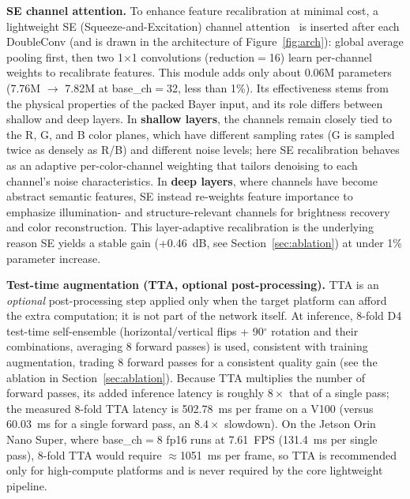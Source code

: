 \documentclass[remotesensing,article,accept,moreauthors]{Definitions/mdpi}
\begin{document}
\textbf{SE channel attention.} To enhance feature recalibration at minimal cost, a lightweight SE (Squeeze-and-Excitation) channel attention~\citep{hu2018se} is inserted after each DoubleConv (and is drawn in the architecture of Figure~\ref{fig:arch}): global average pooling first, then two 1$\times$1 convolutions (reduction$=$16) learn per-channel weights to recalibrate features. This module adds only about 0.06M parameters (7.76M $\rightarrow$ 7.82M at base\_ch$=$32, less than 1\%). Its effectiveness stems from the physical properties of the packed Bayer input, and its role differs between shallow and deep layers. In \textbf{shallow layers}, the channels remain closely tied to the R, G, and B color planes, which have different sampling rates (G is sampled twice as densely as R/B) and different noise levels; here SE recalibration behaves as an adaptive per-color-channel weighting that tailors denoising to each channel's noise characteristics. In \textbf{deep layers}, where channels have become abstract semantic features, SE instead re-weights feature importance to emphasize illumination- and structure-relevant channels for brightness recovery and color reconstruction. This layer-adaptive recalibration is the underlying reason SE yields a stable gain (+0.46~dB, see Section~\ref{sec:ablation}) at under 1\% parameter increase.

\textbf{Test-time augmentation (TTA, optional post-processing).} TTA is an \emph{optional} post-processing step applied only when the target platform can afford the extra computation; it is not part of the network itself. At inference, 8-fold D4 test-time self-ensemble (horizontal/vertical flips + 90$^\circ$ rotation and their combinations, averaging 8 forward passes) is used, consistent with training augmentation, trading 8 forward passes for a consistent quality gain (see the ablation in Section~\ref{sec:ablation}). Because TTA multiplies the number of forward passes, its added inference latency is roughly $8\times$ that of a single pass; the measured 8-fold TTA latency is 502.78~ms per frame on a V100 (versus 60.03~ms for a single forward pass, an $8.4\times$ slowdown). On the Jetson Orin Nano Super, where base\_ch$=$8 fp16 runs at 7.61~FPS (131.4~ms per single pass), 8-fold TTA would require $\approx$1051~ms per frame, so TTA is recommended only for high-compute platforms and is never required by the core lightweight pipeline.
\end{document}
